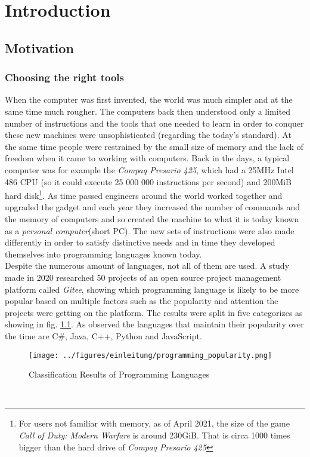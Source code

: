 %
\chapter{Introduction}
\section{Motivation}
\subsection{Choosing the right tools}
When the computer was first invented, the world was much simpler and at the same time much rougher. The computers back then understood only a limited number of instructions and the tools that one needed to learn in order to conquer these new machines were unsophisticated (regarding the today's standard). At the same time people were restrained by the small size of memory and the lack of freedom when it came to working with computers. Back in the days, a typical computer was for example the \textit{Compaq Presario 425}, which had a 25MHz Intel 486 CPU (so it could execute 25 000 000 instructions per second) and 200MiB hard disk\cite{snowden}\footnote{For users not familiar with memory, as of April 2021, the size of the game \textit{Call of Duty: Modern Warfare} is around 230GiB. That is circa 1000 times bigger than the hard drive of \textit{Compaq Presario 425}}. As time passed engineers around the world worked together and upgraded the gadget and each year they increased the number of commands and the memory of computers and so created the machine to what it is today known as a \textit{personal computer}(short PC).
The new sets of instructions were also made differently in order to satisfy distinctive needs and in time they developed themselves into programming languages known today.\\
Despite the numerous amount of languages, not all of them are used.
A study made in 2020 researched 50 projects of an open source project management platform called \textit{Gitee}, showing which programming language is likely to be more popular based on multiple factors such as the popularity and attention the projects were getting on the platform. The results were split in five categorizes as showing in fig. \ref{programming_popularity}.
As observed the languages that maintain their popularity over the time are C\#, Java, C++, Python and JavaScript\cite{9434501}.
\begin{figure}[!htbp]
	\centering
	\texttt{[image: ../figures/einleitung/programming\_popularity.png]}
	\caption{Classification Results of Programming Languages}
	\label{programming_popularity}
\end{figure}\\
